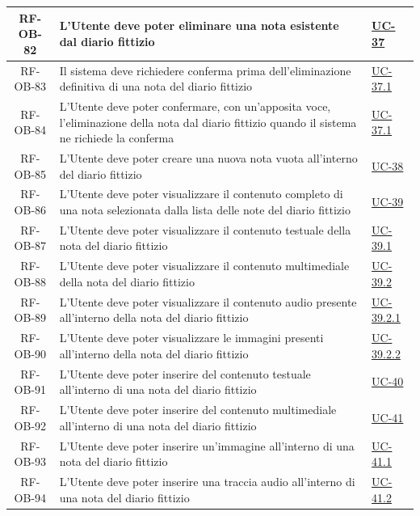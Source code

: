 \documentclass[a4paper,12pt]{article}
\begin{document}
\begin{center}
\begin{longtable}{|c|p{8.5cm}|>{\centering\arraybackslash}p{4cm}|}
\hline
\rowcolor{gray!20}
RF-OB-82 & L'Utente deve poter eliminare una nota esistente dal diario fittizio & \hyperref[subsec:UC-37]{UC-37} \\
\hline
\rowcolor{white}
RF-OB-83 & Il sistema deve richiedere conferma prima dell'eliminazione definitiva di una nota del diario fittizio & \hyperref[subsec:UC-37.1]{UC-37.1} \\
\hline
\rowcolor{gray!20}
RF-OB-84 & L'Utente deve poter confermare, con un'apposita voce, l'eliminazione della nota dal diario fittizio quando il sistema ne richiede la conferma & \hyperref[subsec:UC-37.1]{UC-37.1} \\
\hline
\rowcolor{white}
RF-OB-85 & L'Utente deve poter creare una nuova nota vuota all'interno del diario fittizio & \hyperref[subsec:UC-38]{UC-38} \\
\hline
\rowcolor{gray!20}
RF-OB-86 & L'Utente deve poter visualizzare il contenuto completo di una nota selezionata dalla lista delle note del diario fittizio & \hyperref[subsec:UC-39]{UC-39} \\
\hline
\rowcolor{white}
RF-OB-87 & L'Utente deve poter visualizzare il contenuto testuale della nota del diario fittizio & \hyperref[subsec:UC-39.1]{UC-39.1} \\
\hline
\rowcolor{gray!20}
RF-OB-88 & L'Utente deve poter visualizzare il contenuto multimediale della nota del diario fittizio & \hyperref[subsec:UC-39.2]{UC-39.2} \\
\hline
\rowcolor{white}
RF-OB-89 & L'Utente deve poter visualizzare il contenuto audio presente all'interno della nota del diario fittizio & \hyperref[subsec:UC-39.2.1]{UC-39.2.1} \\
\hline
\rowcolor{gray!20}
RF-OB-90 & L'Utente deve poter visualizzare le immagini presenti all'interno della nota del diario fittizio & \hyperref[subsec:UC-39.2.2]{UC-39.2.2} \\
\hline
\rowcolor{white}
RF-OB-91 & L'Utente deve poter inserire del contenuto testuale all'interno di una nota del diario fittizio & \hyperref[subsec:UC-40]{UC-40} \\
\hline
\rowcolor{gray!20}
RF-OB-92 & L'Utente deve poter inserire del contenuto multimediale all'interno di una nota del diario fittizio & \hyperref[subsec:UC-41]{UC-41} \\
\hline
\rowcolor{white}
RF-OB-93 & L'Utente deve poter inserire un'immagine all'interno di una nota del diario fittizio & \hyperref[subsec:UC-41.1]{UC-41.1} \\
\hline
\rowcolor{gray!20}
RF-OB-94 & L'Utente deve poter inserire una traccia audio all'interno di una nota del diario fittizio & \hyperref[subsec:UC-41.2]{UC-41.2} \\

\end{longtable}
\end{center}
\end{document}
